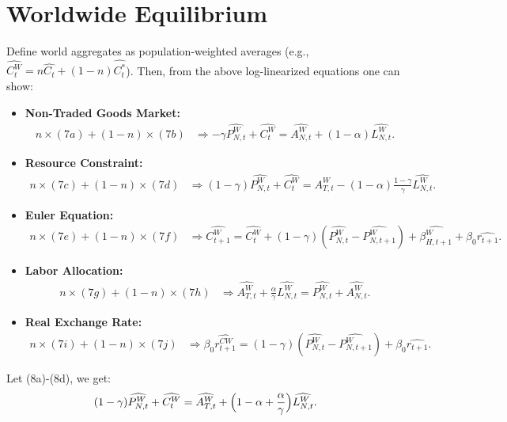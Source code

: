 \documentclass[a4paper,12pt]{article} %
\theoremstyle{nonitalic}
\begin{document}
\section{Worldwide Equilibrium}

Define world aggregates as population-weighted averages (e.g., $  \widehat{C_t^W} = n \widehat{C_t} + (1-n) \widehat{C_t^*}$).
Then, from the above log-linearized equations one can show:
\begin{itemize}
    \item \textbf{Non-Traded Goods Market:}
    \begin{align*}
        n \times (7a) + (1-n) \times (7b) &\Rightarrow -\gamma  \widehat{P_{N,t}^W} +  \widehat{C_t^W} =  \widehat{A_{N,t}^W} + (1-\alpha)  \widehat{L_{N,t}^W} \tag{8a}.
    \end{align*}
    \item \textbf{Resource Constraint:}
    \begin{align*}
        n \times (7c) + (1-n) \times (7d) &\Rightarrow (1-\gamma)  \widehat{P_{N,t}^W} +  \widehat{C_t^W} =  \widehat{A_{T,t}^W} - (1-\alpha) \frac{1-\gamma}{\gamma}  \widehat{L_{N,t}^W} \tag{8b}.
    \end{align*}
    \item \textbf{Euler Equation:}
    \begin{align*}
        n \times (7e) + (1-n) \times (7f) &\Rightarrow  \widehat{C_{t+1}^W} =  \widehat{C_t^W} + (1-\gamma) ( \widehat{P_{N,t}^W} -  \widehat{P_{N,t+1}^W}) +  \widehat{\beta_{H,t+1}^W} + \beta_0 \widehat{r_{t+1}} \tag{8c}.
    \end{align*}
    \item \textbf{Labor Allocation:}
    \begin{align*}
        n \times (7g) + (1-n) \times (7h) &\Rightarrow  \widehat{A_{T,t}^W} + \frac{\alpha}{\gamma}  \widehat{L_{N,t}^W} =  \widehat{P_{N,t}^W} +  \widehat{A_{N,t}^W} \tag{8d}.
    \end{align*}
    \item \textbf{Real Exchange Rate:}
    \begin{align*}
        n \times (7i) + (1-n) \times (7j) &\Rightarrow \beta_0  \widehat{r_{t+1}^{C W}} = (1-\gamma) ( \widehat{P_{N,t}^W} -  \widehat{P_{N,t+1}^W}) + \beta_0  \widehat{r_{t+1}} \tag{8e}.
    \end{align*}
\end{itemize}
Let (8a)-(8d), we get:
\[
(1-\gamma)  \widehat{P_{N,t}^W} +  \widehat{C_t^W} =  \widehat{A_{T,t}^W} + \Bigl(1-\alpha + \frac{\alpha}{\gamma} \Bigr)  \widehat{L_{N,t}^W}.
\]
\end{document}
